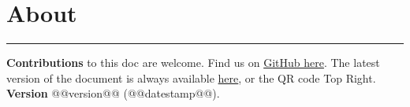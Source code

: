 \section{About}
\hrule

\medskip

\textbf{Contributions} to this doc are welcome. Find us on \href{https://github.com/robert-will-brown/video-streaming-cheatsheet}{GitHub here}.
The latest version of the document is always available \href{https://bit.ly/3p1Omqh}{here}, or the QR code Top Right.
\textbf{Version} @@version@@ (@@datestamp@@).
